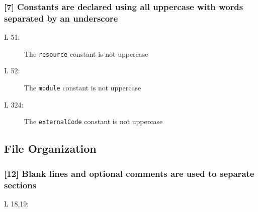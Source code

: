 \subsubsection*{[7] Constants are declared using all uppercase with words separated by an underscore}
\begin{description}
	\item[L 51:] The {\tt resource} constant is not uppercase
	\item[L 52:] The {\tt module} constant is not uppercase
	\item[L 324:] The {\tt externalCode} constant is not uppercase
\end{description}

\subsection{File Organization}

\subsubsection*{[12] Blank lines and optional comments are used to separate sections}
\begin{description}
	\item[L 18,19:]
\end{description}